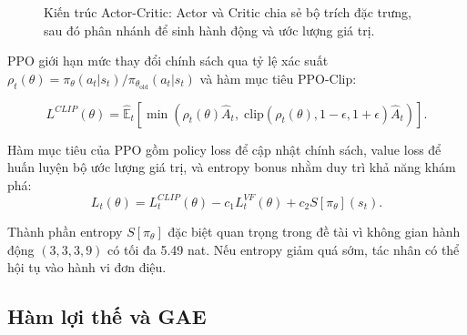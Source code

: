 \begin{figure}[H]
\centering
{}
\caption{Kiến trúc Actor-Critic: Actor và Critic chia sẻ bộ trích đặc trưng, sau đó phân nhánh để sinh hành động và ước lượng giá trị.}
\label{fig:actor_critic}
\end{figure}

PPO giới hạn mức thay đổi chính sách qua tỷ lệ xác suất $\rho_t(\theta) = \pi_\theta(a_t|s_t) / \pi_{\theta_\text{old}}(a_t|s_t)$ và hàm mục tiêu PPO-Clip:

\begin{equation} \label{eq:ppo_clip}
    L^{CLIP}(\theta) =
    \hat{\mathbb{E}}_t
    \left[
    \min
    \left(
    \rho_t(\theta)\hat{A}_t,\;
    \mathrm{clip}(\rho_t(\theta),1-\epsilon,1+\epsilon)\hat{A}_t
    \right)
    \right].
\end{equation}

Hàm mục tiêu của PPO gồm policy loss để cập nhật chính sách, value loss để huấn luyện bộ ước lượng giá trị, và entropy bonus nhằm duy trì khả năng khám phá:
\begin{equation} \label{eq:ppo_total}
    L_t(\theta) = L_t^{CLIP}(\theta) - c_1 L_t^{VF}(\theta) + c_2 S[\pi_\theta](s_t).
\end{equation}

Thành phần entropy $S[\pi_\theta]$ đặc biệt quan trọng trong đề tài vì không gian hành động $(3,3,3,9)$ có tối đa 5.49 nat. Nếu entropy giảm quá sớm, tác nhân có thể hội tụ vào hành vi đơn điệu.

\subsection{Hàm lợi thế và GAE}


